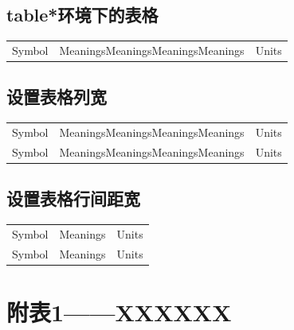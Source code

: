 \documentclass[normalsize]{article}   %
\begin{document}
		\subsection{table*环境下的表格}
			\begin{table}[htbp!]
			\centering
			\begin{tabular}{ccc}
				\toprule[1.5pt]
				\makebox[0.25\textwidth][c]{符号}	& \makebox[0.35\textwidth][c]{意义} & \makebox[0.2\textwidth][c]{单位}	 \\ \hline
				Symbol  & MeaningsMeaningsMeaningsMeanings & Units\\
				\bottomrule
			\end{tabular}%
			\label{tab:addlabel}%
			\end{table}%
		\subsection{设置表格列宽}
			\begin{table}[htbp!]
				\tabcolsep=0.2cm %
			\begin{tabular}{ccc}
				\hline
				\makebox[0.25\textwidth][c]{符号}	& \makebox[0.35\textwidth][c]{意义} & \makebox[0.2\textwidth][c]{单位}	 \\ \hline
				Symbol  & MeaningsMeaningsMeaningsMeanings & Units\\ \hline
				Symbol  & MeaningsMeaningsMeaningsMeanings & Units\\ \hline
			\end{tabular}
			\end{table}
		\subsection{设置表格行间距宽}
		
		\begin{table}[htbp!]
			\renewcommand\arraystretch{0.1} %
			\begin{tabular}{ccc}
				\hline
				\makebox[0.25\textwidth][c]{符号}	& \makebox[0.35\textwidth][c]{意义} & \makebox[0.2\textwidth][c]{单位}	 \\ \hline
				Symbol  & Meanings & Units\\ \hline
				Symbol  & Meanings & Units\\ \hline
			\end{tabular}
		\end{table}
\newpage

\appendix 
	\renewcommand{\appendixname}{Appendix~\Alph{section}}
	\section{附表1——XXXXXX}
	
\newpage	
\begin{thebibliography}{9}%
\end{thebibliography}
\end{document}
